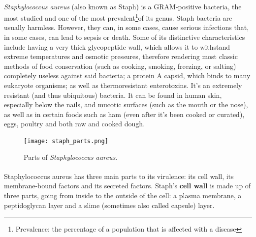 \paragraph{}\emph{Staphylococcus aureus} (also known as Staph) is a GRAM-positive bacteria, the most studied and one of the most prevalent\footnote{Prevalence: the percentage of a population that is affected with a disease}of its genus. Staph bacteria are usually harmless. However, they can, in some cases, cause serious infections that, in some cases, can lead to sepsis or death. Some of its distinctive characteristics include having a very thick glycopeptide wall, which allows it to withstand extreme temperatures and osmotic pressures, therefore rendering most classic methods of food conservation (such as cooking, smoking, freezing, or salting) completely useless against said bacteria; a protein A capsid, which binds to many eukaryote organisms; as well as thermoresistant enterotoxins. It's an extremely resistant (and thus ubiquitous) bacteria. It can be found in human skin, especially below the nails, and mucotic surfaces (such as the mouth or the nose), as well as in certain foods such as ham (even after it's been cooked or curated), eggs, poultry and both raw and cooked dough.\newpage
\begin{figure}\begin{center}\texttt{[image: staph\_parts.png]}\end{center}\caption{Parts of \emph{Staphylococcus aureus}\cite{kongCommunityAssociatedMethicillinResistantStaphylococcus2016}.}\end{figure}\paragraph{}Staphylococcus aureus has three main parts to its virulence: its cell wall, its membrane-bound factors and its secreted factors. Staph's \textbf{cell wall} is made up of three parts, going from inside to the outside of the cell: a plasma membrane, a peptidoglycan layer and a slime (sometimes also called capsule) layer\cite{kongCommunityAssociatedMethicillinResistantStaphylococcus2016}. %
